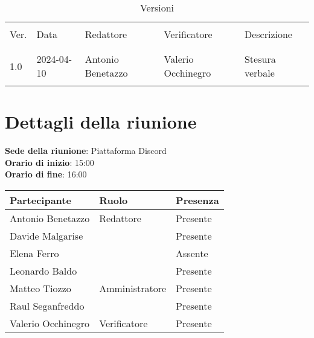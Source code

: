 \documentclass[italian,12pt]{article}
\begin{document}


\newpage



\begin{table}[!h]
	\caption{Versioni}
	\footnotesize
	\begin{center}
		\begin{tabular}{ l l l l l }
			\hline                                                                              \\[-2ex]
			Ver. & Data       & Redattore          & Verificatore       & Descrizione           \\
			\\[-2ex] \hline \\[-1.5ex]
			1.0  & 2024-04-10 & Antonio Benetazzo  & Valerio Occhinegro & Stesura verbale       \\
			\\[-1.5ex] \hline
		\end{tabular}
	\end{center}
\end{table}

\newpage

\tableofcontents

\newpage

\section{Dettagli della riunione}


\textbf{Sede della riunione}: Piattaforma Discord\\
\textbf{Orario di inizio}: 15:00\\
\textbf{Orario di fine}: 16:00\\


\begin{flushleft}
	\begin{table}[!h]
	\begin{tabular}{ |l|l|l| } 
		\hline
		\textbf{Partecipante} & \textbf{Ruolo}       & \textbf{Presenza} \\
		\hline 
		Antonio Benetazzo     & Redattore            & Presente          \\
		Davide Malgarise      &                      & Presente          \\
		Elena Ferro           &                      & Assente           \\
		Leonardo Baldo        &                      & Presente          \\
		Matteo Tiozzo         & Amministratore       & Presente          \\
		Raul Seganfreddo      &                      & Presente          \\
		Valerio Occhinegro    & Verificatore         & Presente          \\
		\hline
	\end{tabular}
	\end{table}
\end{flushleft}
\end{document}
